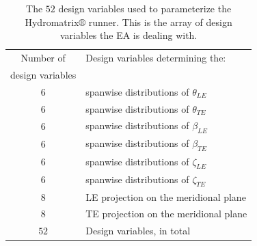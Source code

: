 \begin{table}[h!]
\begin{center}
\begin{tabular}{ |c|l| }
\hline

Number of              & Design variables determining the:\\
design variables       & \\
\hline
6 & spanwise distributions of $\theta_{LE}$\\
\hline
6 & spanwise distributions of $\theta_{TE}$\\
\hline
6 & spanwise distributions of $\beta_{LE}$\\
\hline
6 & spanwise distributions of $\beta_{TE}$\\
\hline
6 & spanwise distributions of $\zeta_{LE}$\\
\hline
6 & spanwise distributions of $\zeta_{TE}$\\
\hline
8 & LE projection on the meridional plane\\
\hline
8 & TE projection on the meridional plane\\
\hline
\hline
$52$ & Design variables, in total \\
\hline   
\end{tabular}
\caption{
The $52$ design variables used to parameterize the Hydromatrix$\circledR$ runner. This is the array of design variables the EA is dealing with.}
\label{design_vars2}
\end{center}
\end{table}

